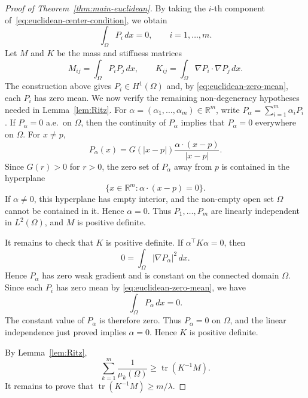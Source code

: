 \documentclass[11pt,letterpaper,reqno]{amsart}
\theoremstyle{definition}
\DeclareMathOperator{\tr}{tr}
\begin{document}
\begin{proof}[Proof of Theorem~\ref{thm:main-euclidean}]
By taking the \(i\)-th component of~\eqref{eq:euclidean-center-condition}, we obtain
\begin{equation}\label{eq:euclidean-zero-mean}
        \int_\Omega P_i\,dx=0,
        \qquad i=1,\ldots,m.
\end{equation}
Let \(M\) and \(K\) be the mass and stiffness matrices
\[
        M_{ij}=\int_\Omega P_iP_j\,dx,
        \qquad
        K_{ij}=\int_\Omega \nabla P_i\cdot\nabla P_j\,dx.
\]
The construction above gives \(P_i\in H^1(\Omega)\) and, by \eqref{eq:euclidean-zero-mean}, each \(P_i\) has zero mean. We now verify the remaining non-degeneracy hypotheses needed in Lemma~\ref{lem:Ritz}. For \(\alpha=(\alpha_1,\ldots,\alpha_m)\in\mathbb R^m\), write $P_\alpha=\sum_{i=1}^m \alpha_i P_i$. If \(P_\alpha=0\) a.e.\ on \(\Omega\), then the continuity of \(P_\alpha\) implies that \(P_\alpha=0\) everywhere on \(\Omega\). For \(x\ne p\),
\[
        P_\alpha(x)
        =
        G(|x-p|)\frac{\alpha\cdot(x-p)}{|x-p|}.
\]
Since \(G(r)>0\) for \(r>0\), the zero set of \(P_\alpha\) away from \(p\) is contained in the hyperplane
\[
        \{x\in\mathbb R^m:\alpha\cdot(x-p)=0\}.
\]
If \(\alpha\ne0\), this hyperplane has empty interior, and the non-empty open set \(\Omega\) cannot be contained in it. Hence \(\alpha=0\). Thus \(P_1,\ldots,P_m\) are linearly independent in \(L^2(\Omega)\), and \(M\) is positive definite.

It remains to check that \(K\) is positive definite. If
\(\alpha^\top  K\alpha=0\), then
\[
        0=\int_\Omega |\nabla P_\alpha|^2\,dx.
\]
Hence \(P_\alpha\) has zero weak gradient and is constant on the connected
domain \(\Omega\). Since each \(P_i\) has zero mean by
\eqref{eq:euclidean-zero-mean}, we have
\[
        \int_\Omega P_\alpha\,dx=0.
\]
The constant value of \(P_\alpha\) is therefore zero. Thus
\(P_\alpha=0\) on \(\Omega\), and the linear independence just proved
implies \(\alpha=0\). Hence \(K\) is positive definite.




By Lemma~\ref{lem:Ritz},
\begin{equation}\label{eq:euclidean-Ritz}
        \sum_{k=1}^m\frac1{\mu_k(\Omega)}\geq \tr(K^{-1}M).
\end{equation}
It remains to prove that \(\tr(K^{-1}M)\geq m/\lambda\).




\end{proof}
\end{document}

